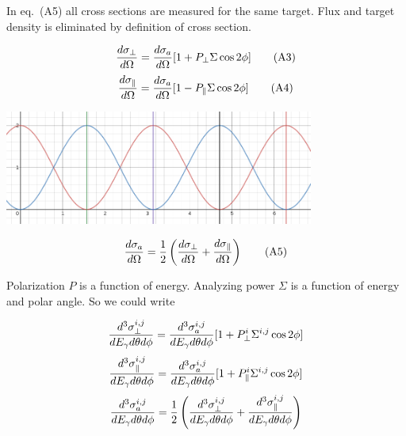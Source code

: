 \documentclass{article}
\begin{document}
In eq.~(A5) all cross sections are measured for the same target. Flux and target density is eliminated by definition of cross section.

\begin{equation}
{d\sigma_\perp \over d\Omega} = {d\sigma_a \over d\Omega}[1+P_\perp\Sigma\cos 2\phi] \tag{A3} \\
\end{equation}
\begin{equation}
{d\sigma_\parallel \over d\Omega} = {d\sigma_a \over d\Omega}[1-P_\parallel\Sigma\cos 2\phi] \tag{A4} \\
\end{equation}

\includegraphics[width=4in]{assymetry.png}

\begin{equation}
{d\sigma_a \over d\Omega} = {1 \over 2} \left( {d\sigma_\perp \over d\Omega} + {d\sigma_\parallel \over d\Omega} \right) \tag{A5} \\
\end{equation}

Polarization $P$ is a function of energy. Analyzing power $\Sigma$ is a function of energy and polar angle. So we could write

\begin{equation}
{d^3\sigma^{i,j}_\perp \over dE_\gamma d\theta d\phi} = {d^3\sigma^{i,j}_a \over dE_\gamma d\theta d\phi}[1+P^i_\perp\Sigma^{i,j}\cos 2\phi] \\
\end{equation}
\begin{equation}
{d^3\sigma^{i,j}_\parallel \over dE_\gamma d\theta d\phi} = {d^3\sigma^{i,j}_a \over dE_\gamma d\theta d\phi}[1+P^i_\parallel\Sigma^{i,j}\cos 2\phi] \\
\end{equation}
\begin{equation}
  {d^3\sigma^{i,j}_a \over dE_\gamma d\theta d\phi}
  = {1 \over 2} \left( {d^3\sigma^{i,j}_\perp \over dE_\gamma d\theta d\phi}
  + {d^3\sigma^{i,j}_\parallel \over dE_\gamma d\theta d\phi} \right)
\end{equation}
\end{document}
